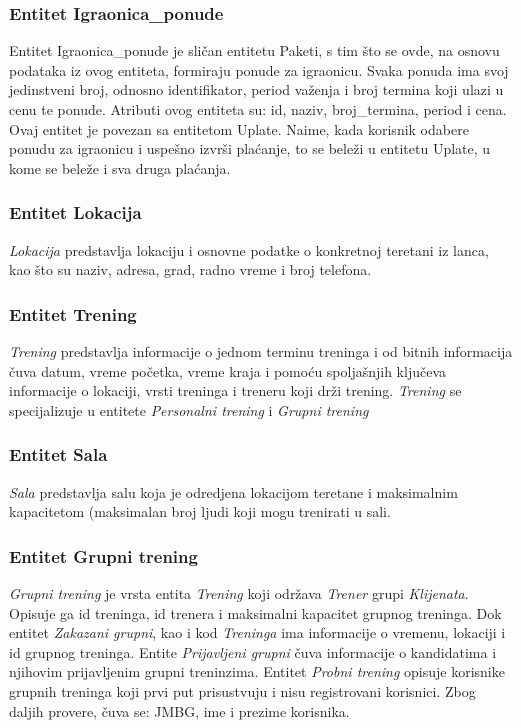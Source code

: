 \documentclass[../main.tex]{subfiles}
\begin{document}
\subsubsection{Entitet Igraonica\_ponude}
Entitet Igraonica\_ponude je sličan entitetu Paketi, s tim što se ovde, na osnovu podataka iz ovog entiteta, formiraju ponude za igraonicu. Svaka ponuda ima svoj jedinstveni broj, odnosno identifikator, period važenja i broj termina koji ulazi u cenu te ponude. Atributi ovog entiteta su: id, naziv, broj\_termina, period i cena. Ovaj entitet je povezan sa entitetom Uplate. Naime, kada korisnik odabere ponudu za igraonicu i uspešno izvrši plaćanje, to se beleži u entitetu Uplate, u kome se beleže i sva druga plaćanja.


\subsubsection{Entitet Lokacija}

\textit{Lokacija} predstavlja lokaciju i osnovne podatke o konkretnoj teretani iz lanca, kao što su naziv, adresa, grad, radno vreme i broj telefona.


\subsubsection{Entitet Trening}

\textit{Trening} predstavlja informacije o jednom terminu treninga i od bitnih informacija čuva datum, vreme početka, vreme kraja i pomoću spoljašnjih ključeva informacije o lokaciji, vrsti treninga i treneru koji drži trening. \textit{Trening} se specijalizuje u entitete \textit{Personalni trening} i \textit{Grupni trening}


\subsubsection{Entitet Sala}

\textit{Sala} predstavlja salu koja je odredjena lokacijom teretane i maksimalnim kapacitetom (maksimalan broj ljudi koji mogu trenirati u sali.


\subsubsection{Entitet Grupni trening}

\textit{Grupni trening} je vrsta entita \textit{Trening} koji održava \textit{Trener} grupi \textit{Klijenata}. Opisuje ga id treninga, id trenera i maksimalni kapacitet grupnog treninga. Dok entitet \textit{Zakazani grupni}, kao i kod \textit{Treninga} ima informacije o vremenu, lokaciji i id grupnog treninga.
Entite \textit{Prijavljeni grupni} čuva informacije o kandidatima i njihovim prijavljenim grupni treninzima.
Entitet \textit{Probni trening} opisuje korisnike grupnih treninga koji prvi put prisustvuju i nisu registrovani korisnici. Zbog daljih provere, čuva se: JMBG, ime i prezime korisnika.
\end{document}
